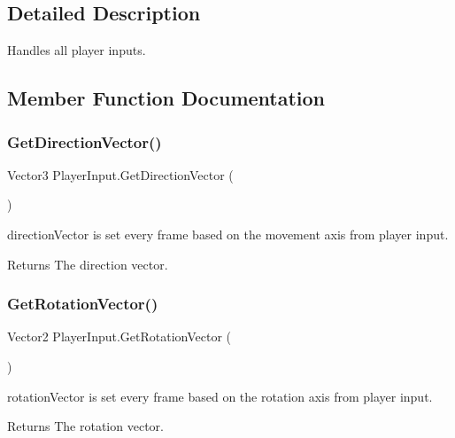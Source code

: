 \subsection{Detailed Description}
Handles all player inputs. 



\subsection{Member Function Documentation}
\hypertarget{class_player_input_a2e54d5137932455e223719b97faee11e}{}\label{class_player_input_a2e54d5137932455e223719b97faee11e} 
\subsubsection{\texorpdfstring{Get\+Direction\+Vector()}{GetDirectionVector()}}
{\footnotesize\ttfamily Vector3 Player\+Input.\+Get\+Direction\+Vector (\begin{DoxyParamCaption}{ }\end{DoxyParamCaption})}



direction\+Vector is set every frame based on the movement axis from player input. 

\begin{DoxyReturn}{Returns}
The direction vector.
\end{DoxyReturn}
\hypertarget{class_player_input_ab3fdfb50d2249378777418c368c88ab1}{}\label{class_player_input_ab3fdfb50d2249378777418c368c88ab1} 
\subsubsection{\texorpdfstring{Get\+Rotation\+Vector()}{GetRotationVector()}}
{\footnotesize\ttfamily Vector2 Player\+Input.\+Get\+Rotation\+Vector (\begin{DoxyParamCaption}{ }\end{DoxyParamCaption})}



rotation\+Vector is set every frame based on the rotation axis from player input. 

\begin{DoxyReturn}{Returns}
The rotation vector.
\end{DoxyReturn}
\hypertarget{class_player_input_a36250201429a47f8d4e9c6e814257324}{}\label{class_player_input_a36250201429a47f8d4e9c6e814257324} 
